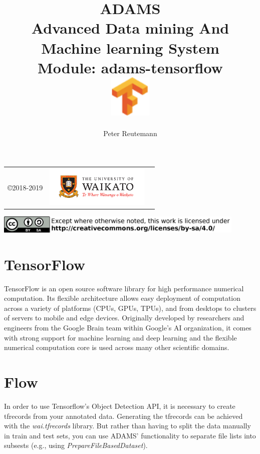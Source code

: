 \documentclass[a4paper]{book}
\title{
  \textbf{ADAMS} \\
  {\Large \textbf{A}dvanced \textbf{D}ata mining \textbf{A}nd \textbf{M}achine
  learning \textbf{S}ystem} \\
  {\Large Module: adams-tensorflow} \\
  \vspace{1cm}
  \includegraphics[width=2cm]{images/tensorflow-module.png} \\
}
\author{
  Peter Reutemann
}
\begin{document}
\begin{titlepage}
\maketitle

\thispagestyle{empty}
\center
\begin{table}[b]
	\begin{tabular}{c l l}
		\parbox[c][2cm]{2cm}{\copyright 2018-2019} &
		\parbox[c][2cm]{5cm}{\includegraphics[width=5cm]{images/coat_of_arms.pdf}} \\
	\end{tabular}
	\includegraphics[width=12cm]{images/cc.png} \\
\end{table}

\end{titlepage}

\tableofcontents

\chapter{TensorFlow}
TensorFlow\cite{tensorflow} is an open source software library for high performance
numerical computation. Its flexible architecture allows easy deployment of
computation across a variety of platforms (CPUs, GPUs, TPUs), and from desktops
to clusters of servers to mobile and edge devices. Originally developed by
researchers and engineers from the Google Brain team within Google's AI
organization, it comes with strong support for machine learning and deep
learning and the flexible numerical computation core is used across many other
scientific domains.


\chapter{Flow}
In order to use Tensorflow's Object Detection API\cite{objdet}, it is necessary
to create tfrecords\cite{tfrecord} from your annotated data.
Generating the tfrecords can be achieved with the \textit{wai.tfrecords}\cite{waitfrecords}
library. But rather than having to split the data manually in train and test sets,
you can use ADAMS' functionality to separate file lists into subsests (e.g., using
\textit{PrepareFileBasedDataset}).
\end{document}

